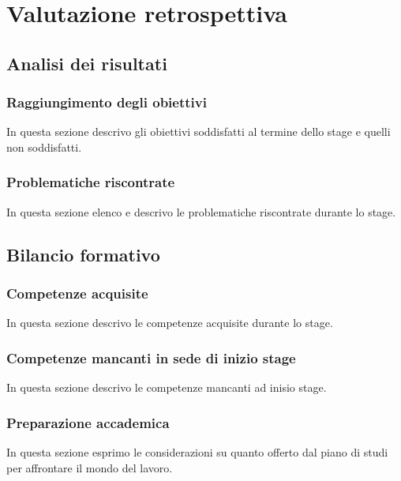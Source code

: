 
\chapter{Valutazione retrospettiva}
\label{cap:valutazione}
\section{Analisi dei risultati}

\subsection{Raggiungimento degli obiettivi}
In questa sezione descrivo gli obiettivi soddisfatti al termine dello stage e quelli non soddisfatti.

\subsection{Problematiche riscontrate}
In questa sezione elenco e descrivo le problematiche riscontrate durante lo stage.

\section{Bilancio formativo}

\subsection{Competenze acquisite}
In questa sezione descrivo le competenze acquisite durante lo stage.

\subsection{Competenze mancanti in sede di inizio stage}
In questa sezione descrivo le competenze mancanti ad inisio stage.

\subsection{Preparazione accademica}
In questa sezione esprimo le considerazioni su quanto offerto dal piano di studi per affrontare il mondo del lavoro.